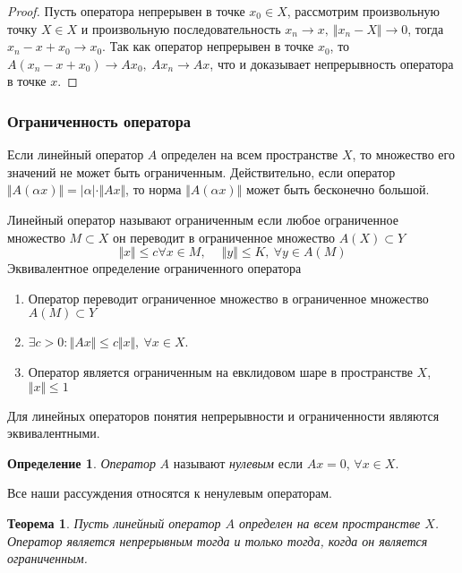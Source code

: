 \documentclass[14pt,a4paper]{extarticle}
\newtheorem{theorem}{Теорема}[section]
\theoremstyle{definition}
\newtheorem{definition}{Определение}[section]
\theoremstyle{remark}
\renewcommand{\[}{\begin{dmath*}[compact]}
\renewcommand{\]}{\end{dmath*}}
\newcommand{\be}{\begin{enumerate}}
\newcommand{\ee}{\end{enumerate}}
\newcommand{\sep}{ , \ \allowbreak }
\begin{document}
\begin{proof}
  Пусть оператора непрерывен в точке $x_0 \in X$, рассмотрим произвольную точку
  $X \in X$ и произвольную последовательность
  $x_n \to x \sep \Vert x_n - X \Vert \to 0$, тогда $x_n - x + x_0 \to x_0$.
  Так как оператор непрерывен в точке $x_0$,
  то $A(x_n-x+x_0) \to Ax_0 \sep Ax_n \to Ax$,
  что и доказывает непрерывность оператора в точке $x$.
\end{proof}

\subsubsection{Ограниченность оператора}

Если линейный оператор $A$ определен на всем пространстве $X$,
то множество его значений не может быть ограниченным.
Действительно, если оператор
$\Vert A (\alpha x) \Vert = |\alpha| \cdot \Vert Ax \Vert$,
то норма $\Vert A (\alpha x) \Vert$ может быть бесконечно большой.

Линейный оператор называют ограниченным если любое ограниченное множество
$M \subset X$ он переводит в ограниченное множество $A (X) \subset Y$
\[\Vert x \Vert \leq c \forall x \in M \sep \quad
\Vert y \Vert \leq K \sep \forall y \in A (M)\]
Эквивалентное определение ограниченного оператора

\be
  \item Оператор переводит ограниченное множество в ограниченное множество
  $A(M) \subset Y$

  \item $\exists c > 0: \Vert Ax \Vert \leq c \Vert x \Vert \sep \forall x \in X$.

  \item Оператор является ограниченным на евклидовом шаре в пространстве $X$,
  $\Vert x \Vert \leq 1$
\ee

Для линейных операторов понятия непрерывности и ограниченности являются
эквивалентными.

\begin{definition}
  \textit{Оператор} $A$ называют \textit{нулевым} если $Ax=0$,
  $\forall x \in X$.
\end{definition}

Все наши рассуждения относятся к ненулевым операторам.

\begin{theorem}
  Пусть линейный оператор $A$ определен на всем пространстве $X$.
  Оператор является непрерывным тогда и только тогда, когда он является
  ограниченным.
\end{theorem}
\end{document}
